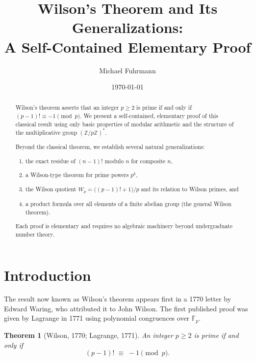 \documentclass[12pt,a4paper]{amsart}
\newtheorem{theorem}{Theorem}[section]
\theoremstyle{definition}
\newcommand{\Z}{\mathbb{Z}}
\newcommand{\Fp}{\mathbb{F}_p}
\begin{document}

\title{Wilson's Theorem and Its Generalizations:\\
       A Self-Contained Elementary Proof}

\author{Michael Fuhrmann}
\address{Specialist Mathematics Project, Build 62}
\date{\today}

\begin{abstract}
Wilson's theorem asserts that an integer $p \geq 2$ is prime if and only if
$(p-1)! \equiv -1 \pmod{p}$.
We present a self-contained, elementary proof of this classical result
using only basic properties of modular arithmetic and the structure of
the multiplicative group $(\Z/p\Z)^*$.

Beyond the classical theorem, we establish several natural generalizations:
\begin{enumerate}
  \item[(i)]   the exact residue of $(n-1)!$ modulo $n$ for composite $n$,
  \item[(ii)]  a Wilson-type theorem for prime powers $p^k$,
  \item[(iii)] the Wilson quotient $W_p = \bigl((p-1)!+1\bigr)/p$
               and its relation to Wilson primes, and
  \item[(iv)]  a product formula over all elements of a finite abelian group
               (the general Wilson theorem).
\end{enumerate}
Each proof is elementary and requires no algebraic machinery beyond
undergraduate number theory.
\end{abstract}

\maketitle
\tableofcontents

\section{Introduction}

The result now known as Wilson's theorem appears first in a 1770 letter
by Edward Waring, who attributed it to John Wilson.
The first published proof was given by Lagrange in 1771 using
polynomial congruences over $\Fp$.

\begin{theorem}[Wilson, 1770; Lagrange, 1771]\label{thm:wilson}
  An integer $p \geq 2$ is prime if and only if
  \[
    (p-1)! \;\equiv\; -1 \pmod{p}.
  \]
\end{theorem}
\end{document}
